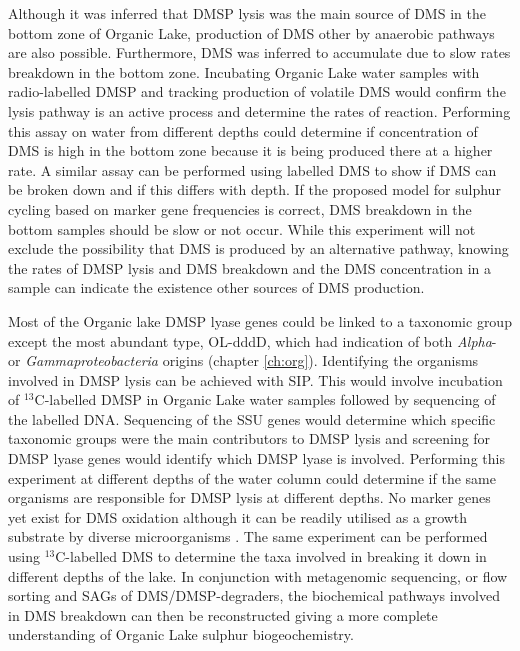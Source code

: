 Although it was inferred that \ac{DMSP} lysis was the main source of \ac{DMS} in the bottom zone of Organic Lake, production of \ac{DMS} other by anaerobic pathways are also possible.
Furthermore, \ac{DMS} was inferred to accumulate due to slow rates breakdown in the bottom zone.
Incubating Organic Lake water samples with radio-labelled \ac{DMSP} and tracking production of volatile \ac{DMS} would confirm the lysis pathway is an active process and determine the rates of reaction.
Performing this assay on water from different depths could determine if concentration of \ac{DMS} is high in the bottom zone because it is being produced there at a higher rate.
A similar assay can be performed using labelled \ac{DMS} to show if \ac{DMS} can be broken down and if this differs with depth.
If the proposed model for sulphur cycling based on marker gene frequencies is correct, \ac{DMS} breakdown in the bottom samples should be slow or not occur.
While this experiment will not exclude the possibility that \ac{DMS} is produced by an alternative pathway, knowing the rates of \ac{DMSP} lysis and \ac{DMS} breakdown and the \ac{DMS} concentration in a sample can indicate the existence other sources of \ac{DMS} production.

Most of the Organic lake \ac{DMSP} lyase genes could be linked to a taxonomic group except the most abundant type, OL-dddD, which had indication of both \emph{Alpha}- or \emph{Gammaproteobacteria} origins (chapter \ref{ch:org}).
Identifying the organisms involved in \ac{DMSP} lysis can be achieved with \ac{SIP}.
This would involve incubation of $^{13}$C-labelled \ac{DMSP} in Organic Lake water samples followed by sequencing of the labelled DNA.
Sequencing of the \ac{SSU} genes would determine which specific taxonomic groups were the main contributors to \ac{DMSP} lysis and screening for \ac{DMSP} lyase genes would identify which \ac{DMSP} lyase is involved.
Performing this experiment at different depths of the water column could determine if the same organisms are responsible for \ac{DMSP} lysis at different depths.
No marker genes yet exist for \ac{DMS} oxidation although it can be readily utilised as a growth substrate by diverse microorganisms \cite{Johnston2008}.
The same experiment can be performed using $^{13}$C-labelled \ac{DMS} to determine the taxa involved in breaking it down in different depths of the lake.
In conjunction with metagenomic sequencing, or flow sorting and \acp{SAG} of \ac{DMS}/\ac{DMSP}-degraders, the biochemical pathways involved in \ac{DMS} breakdown can then be reconstructed giving a more complete understanding of Organic Lake sulphur biogeochemistry.

